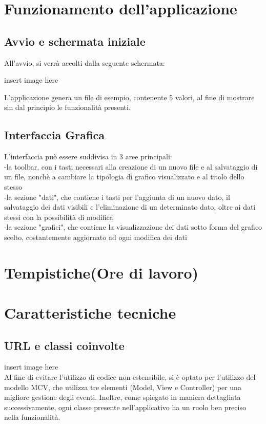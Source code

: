 \documentclass[10pt]{article}
\begin{document}
    \section{Funzionamento dell'applicazione}
    \subsection{Avvio e schermata iniziale}
    All'avvio, si verrà accolti dalla seguente schermata:
    
    insert image here
    
    L'applicazione genera un file di esempio, contenente 5 valori, al fine di mostrare sin dal principio le funzionalità presenti.
     
    \subsection{Interfaccia Grafica}
    L'interfaccia può essere suddivisa in 3 aree principali:\\
    -la toolbar, con i tasti necessari alla creazione di un nuovo file e al salvataggio di un file, nonchè a cambiare la tipologia di grafico visualizzato e al titolo dello stesso\\
    -la sezione "dati", che contiene i tasti per l'aggiunta di un nuovo dato, il salvataggio dei dati visibili e l'eliminazione di un determinato dato, oltre ai dati stessi con la possibilità di modifica\\
    -la sezione "grafici", che contiene la visualizzazione dei dati sotto forma del grafico scelto, costantemente aggiornato ad ogni modifica dei dati
    
    \section{Tempistiche(Ore di lavoro)}
    \section{Caratteristiche tecniche}
    \subsection{URL e classi coinvolte}
    insert image here\\
    Al fine di evitare l'utilizzo di codice non estensibile, si è optato per l'utilizzo del modello MCV, che utilizza tre elementi (Model, View e Controller) per una migliore gestione degli eventi. Inoltre, come spiegato in maniera dettagliata successivamente, ogni classe presente nell'applicativo ha un ruolo ben preciso nella funzionalità.
\end{document}
